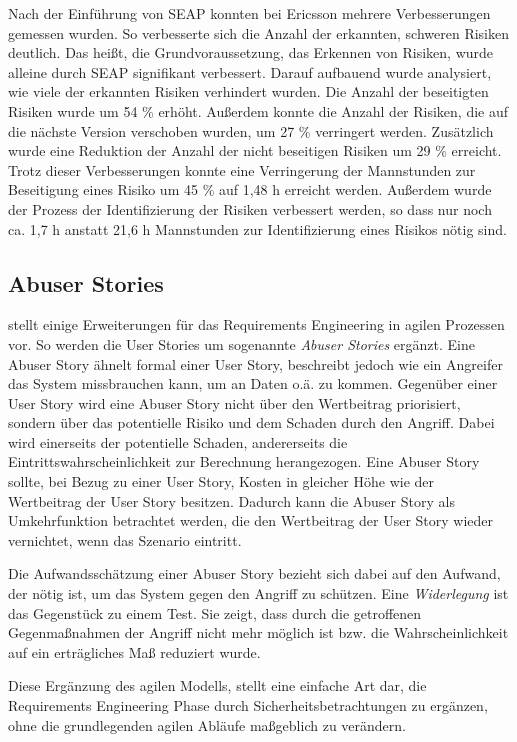 Nach der Einführung von SEAP konnten bei Ericsson mehrere Verbesserungen gemessen wurden.
So verbesserte sich die Anzahl der erkannten, schweren Risiken deutlich. 
Das heißt, die Grundvoraussetzung, das Erkennen von Risiken, wurde alleine durch SEAP signifikant verbessert.
Darauf aufbauend wurde analysiert, wie viele der erkannten Risiken verhindert wurden.
Die Anzahl der beseitigten Risiken wurde um 54 \% erhöht.
Außerdem konnte die Anzahl der Risiken, die auf die nächste Version verschoben wurden, um 27 \% verringert werden.
Zusätzlich wurde eine Reduktion der Anzahl der nicht beseitigen Risiken um 29 \% erreicht.
Trotz dieser Verbesserungen konnte eine Verringerung der Mannstunden zur Beseitigung eines Risiko um 45 \% auf 1,48 h erreicht werden.
Außerdem wurde der Prozess der Identifizierung der Risiken verbessert werden, so dass nur noch ca. 1,7 h anstatt 21,6 h Mannstunden zur Identifizierung eines Risikos nötig sind.

\subsection{Abuser Stories} 

\parencite[][]{peeters2005agile} stellt einige Erweiterungen für das Requirements Engineering in agilen Prozessen vor.
So werden die User Stories um sogenannte \emph{Abuser Stories} ergänzt.
Eine Abuser Story ähnelt formal einer User Story, beschreibt jedoch wie ein Angreifer das System missbrauchen kann, um an Daten o.ä. zu kommen.
Gegenüber einer User Story wird eine Abuser Story nicht über den Wertbeitrag priorisiert, sondern über das potentielle Risiko und dem Schaden durch den Angriff.
Dabei wird einerseits der potentielle Schaden, andererseits die Eintrittswahrscheinlichkeit zur Berechnung herangezogen.
Eine Abuser Story sollte, bei Bezug zu einer User Story, Kosten in gleicher Höhe wie der Wertbeitrag der User Story besitzen.
Dadurch kann die Abuser Story als Umkehrfunktion betrachtet werden, die den Wertbeitrag der User Story wieder vernichtet, wenn das Szenario eintritt.

Die Aufwandsschätzung einer Abuser Story bezieht sich dabei auf den Aufwand, der nötig ist, um das System gegen den Angriff zu schützen.
Eine \emph{Widerlegung} ist das Gegenstück zu einem Test. 
Sie zeigt, dass durch die getroffenen Gegenmaßnahmen der Angriff nicht mehr möglich ist bzw. die Wahrscheinlichkeit auf ein erträgliches Maß reduziert wurde.

Diese Ergänzung des agilen Modells, stellt eine einfache Art dar, die Requirements Engineering Phase durch Sicherheitsbetrachtungen zu ergänzen, ohne die grundlegenden agilen Abläufe maßgeblich zu verändern.

